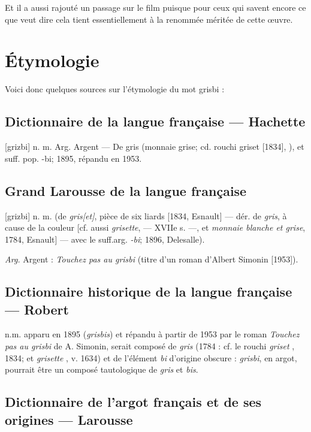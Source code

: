 Et il a aussi rajouté un passage sur le film puisque pour ceux qui savent encore ce que  veut dire cela tient essentiellement à la renommée méritée de cette \oe uvre.


\section{Étymologie\label{preamble-etymology}}


Voici donc quelques sources sur l'étymologie du mot grisbi :


\subsection*{Dictionnaire de la langue française --- Hachette}

[grizbi] n. m. Arg. Argent --- De gris (monnaie grise; cd. rouchi griset [1834], ), et suff. pop. -bi; 1895, répandu en 1953.


\subsection*{Grand Larousse de la langue française}

[grizbi] n. m. (de \emph{gris[et]}, pièce de six liards [1834, Esnault] --- dér. de \emph{gris}, à cause de la couleur [cf. aussi \emph{grisette},  --- XVIIe s. ---, et \emph{monnaie blanche et grise}, 1784, Esnault] --- avec le suff.arg. \emph{-bi}; 1896, Delesalle).

\emph{Arg.} Argent : \emph{Touchez pas au grisbi} (titre d'un roman d'Albert Simonin [1953]).


\subsection*{Dictionnaire historique de la langue française --- Robert}

n.m. apparu en 1895 (\emph{grisbis}) et répandu à partir de 1953 par le roman \emph{Touchez pas au grisbi} de A. Simonin, serait composé de \emph{gris}  (1784 : cf. le rouchi \emph{griset} , 1834; et \emph{grisette} , v. 1634) et de l'élément \emph{bi} d'origine obscure : \emph{grisbi},  en argot, pourrait être un composé tautologique de \emph{gris} et \emph{bis}.


\subsection*{Dictionnaire de l'argot français et de ses origines --- Larousse}

